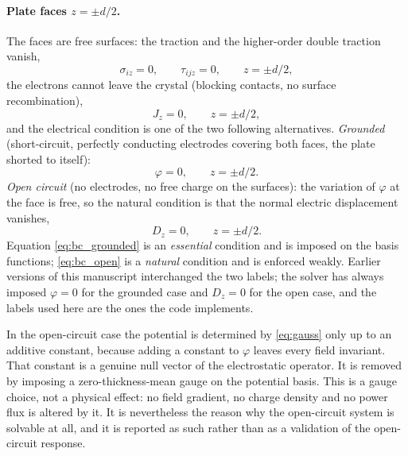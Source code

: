 \paragraph{Plate faces $z=\pm d/2$.}
The faces are free surfaces: the traction and the higher-order double traction
vanish,
\begin{equation}
\label{eq:bc_faces_mech}
\sigma_{iz}=0,\qquad \tau_{ijz}=0,\qquad z=\pm d/2,
\end{equation}
the electrons cannot leave the crystal (blocking contacts, no surface
recombination),
\begin{equation}
\label{eq:bc_faces_carrier}
J_z=0,\qquad z=\pm d/2,
\end{equation}
and the electrical condition is one of the two following alternatives.
\emph{Grounded} (short-circuit, perfectly conducting electrodes covering both
faces, the plate shorted to itself):
\begin{equation}
\label{eq:bc_grounded}
\varphi=0,\qquad z=\pm d/2 .
\end{equation}
\emph{Open circuit} (no electrodes, no free charge on the surfaces): the
variation of $\varphi$ at the face is free, so the natural condition is that the
normal electric displacement vanishes,
\begin{equation}
\label{eq:bc_open}
D_z=0,\qquad z=\pm d/2 .
\end{equation}
Equation \eqref{eq:bc_grounded} is an \emph{essential} condition and is imposed
on the basis functions; \eqref{eq:bc_open} is a \emph{natural} condition and is
enforced weakly.  Earlier versions of this manuscript interchanged the two
labels; the solver has always imposed $\varphi=0$ for the grounded case and
$D_z=0$ for the open case, and the labels used here are the ones the code
implements.

In the open-circuit case the potential is determined by \eqref{eq:gauss} only
up to an additive constant, because adding a constant to $\varphi$ leaves every
field invariant.  That constant is a genuine null vector of the electrostatic
operator.  It is removed by imposing a zero-thickness-mean gauge on the
potential basis.  This is a gauge choice, not a physical effect: no field
gradient, no charge density and no power flux is altered by it.  It is
nevertheless the reason why the open-circuit system is solvable at all, and it
is reported as such rather than as a validation of the open-circuit response.


